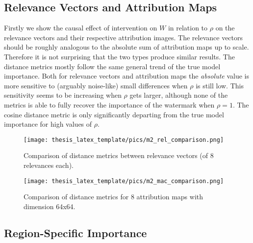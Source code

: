 \subsection{Relevance Vectors and Attribution Maps}
Firstly we show the causal effect of intervention on $W$ in relation to $\rho$ on the relevance vectors and their respective attribution images. 
The relevance vectors should be roughly analogous to the absolute sum of attribution maps up to scale. Therefore it is not surprising that the two types produce similar results.
The distance metrics mostly follow the same general trend of the true model importance. 
Both for relevance vectors and attribution maps the \textit{absolute} value is more sensitive to (arguably noise-like) small differences when $\rho$ is still low. This sensitivity seems to be increasing when $\rho$ gets larger, although none of the metrics is able to fully recover the importance of the watermark when $\rho = 1$. 
The cosine distance metric is only significantly departing from the true model importance for high values of $\rho$. 

\begin{figure}
    \centering
    \texttt{[image: thesis\_latex\_template/pics/m2\_rel\_comparison.png]}
    \caption[Relevance Vector, Comparison of Metrics]{Comparison of distance metrics between relevance vectors (of 8 relevances each).}
    \label{fig:m2_rel_comparison}
\end{figure}

\begin{figure}
    \centering
    \texttt{[image: thesis\_latex\_template/pics/m2\_mac\_comparison.png]}
    \caption[Attribution Maps, Comparison of Metrics]{Comparison of distance metrics for 8 attribution maps with dimension 64x64.}
    \label{fig:m2_mac_comparison}
\end{figure}

\subsection{Region-Specific Importance}

